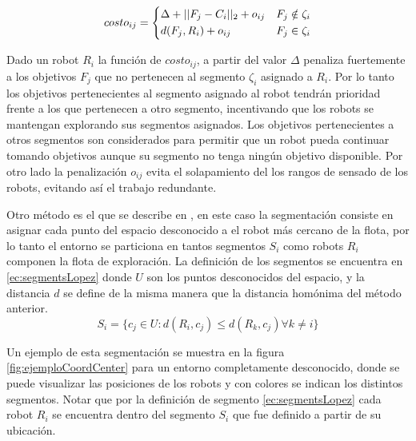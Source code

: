 \begin{equation}\label{ec:costsolanas}
costo_{ij} = 
\begin{dcases}
  \Delta + || F_j - C_i ||_2 + o_{ij} & F_j \notin \zeta_i \\
  d(F_j, R_i) + o_{ij}                & F_j \in    \zeta_i
\end{dcases}
\end{equation}

Dado un robot $R_i$ la función de $costo_{ij}$, a partir del valor $\Delta$ penaliza fuertemente a los objetivos $F_j$ que no pertenecen al segmento $\zeta_i$ asignado a $R_i$. Por lo tanto los objetivos pertenecientes al segmento asignado al robot tendrán prioridad frente a los que pertenecen a otro segmento, incentivando que los robots se mantengan explorando sus segmentos asignados. Los objetivos pertenecientes a otros segmentos son considerados para permitir que un robot pueda continuar tomando objetivos aunque su segmento no tenga ningún objetivo disponible. Por otro lado la penalización $o_{ij}$ evita el solapamiento del los rangos de sensado de los robots, evitando así el trabajo redundante.\medbreak

Otro método es el que se describe en \cite{Lopez-Perez2018}, en este caso la segmentación consiste en asignar cada punto del espacio desconocido a el robot más cercano de la flota, por lo tanto el entorno se particiona en tantos segmentos $S_i$ como robots $R_i$ componen la flota de exploración. La definición de los segmentos se encuentra en \eqref{ec:segmentsLopez} donde $U$ son los puntos desconocidos del espacio, y la distancia $d$ se define de la misma manera que la distancia homónima del método anterior.
\begin{equation}\label{ec:segmentsLopez}
  S_i=\{c_j \in U : d(R_i,c_j)\leq d(R_k,c_j) \forall k \neq i \}
\end{equation}


Un ejemplo de esta segmentación se muestra en la figura \ref{fig:ejemploCoordCenter} para un entorno completamente desconocido, donde se puede visualizar las posiciones de los robots y con colores se indican los distintos segmentos. Notar que por la definición de segmento \eqref{ec:segmentsLopez} cada robot $R_i$ se encuentra dentro del segmento $S_i$ que fue definido a partir de su ubicación. %

